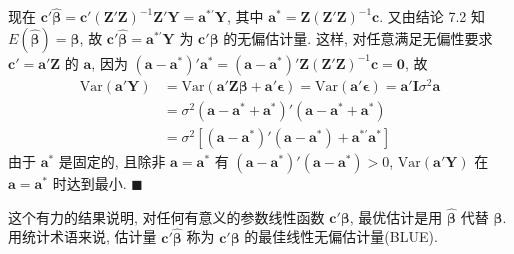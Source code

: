 现在 $\mathbf{c}'\hat{\boldsymbol{\beta}}=\mathbf{c}'(\mathbf{Z}'\mathbf{Z})^{-1}\mathbf{Z}'\mathbf{Y}=\mathbf{a}^{*'}\mathbf{Y}$, 其中 $\mathbf{a}^*=\mathbf{Z}(\mathbf{Z}'\mathbf{Z})^{-1}\mathbf{c}$. 又由结论 7.2 知 $E(\hat{\boldsymbol{\beta}})=\boldsymbol{\beta}$, 故 $\mathbf{c}'\hat{\boldsymbol{\beta}}=\mathbf{a}^{*'}\mathbf{Y}$ 为 $\mathbf{c}'\boldsymbol{\beta}$ 的无偏估计量. 这样, 对任意满足无偏性要求 $\mathbf{c}'=\mathbf{a}'\mathbf{Z}$ 的 $\mathbf{a}$, 因为 $(\mathbf{a}-\mathbf{a}^*)'\mathbf{a}^*=(\mathbf{a}-\mathbf{a}^*)'\mathbf{Z}(\mathbf{Z}'\mathbf{Z})^{-1}\mathbf{c}=\mathbf{0}$, 故
\[
\begin{aligned}
\text{Var}(\mathbf{a}'\mathbf{Y})&=\text{Var}(\mathbf{a}'\mathbf{Z}\boldsymbol{\beta}+\mathbf{a}'\boldsymbol{\epsilon})=\text{Var}(\mathbf{a}'\boldsymbol{\epsilon})=\mathbf{a}'\mathbf{I}\sigma^2\mathbf{a}\\
&=\sigma^2(\mathbf{a}-\mathbf{a}^*+\mathbf{a}^*)'(\mathbf{a}-\mathbf{a}^*+\mathbf{a}^*)\\
&=\sigma^2[(\mathbf{a}-\mathbf{a}^*)'(\mathbf{a}-\mathbf{a}^*)+\mathbf{a}^{*'}\mathbf{a}^*]
\end{aligned}
\]
由于 $\mathbf{a}^*$ 是固定的, 且除非 $\mathbf{a}=\mathbf{a}^*$ 有 $(\mathbf{a}-\mathbf{a}^*)'(\mathbf{a}-\mathbf{a}^*)>0$, $\text{Var}(\mathbf{a}'\mathbf{Y})$ 在 $\mathbf{a}=\mathbf{a}^*$ 时达到最小. \hfill$\blacksquare$

这个有力的结果说明, 对任何有意义的参数线性函数 $\mathbf{c}'\boldsymbol{\beta}$, 最优估计是用 $\hat{\boldsymbol{\beta}}$ 代替 $\boldsymbol{\beta}$. 用统计术语来说, 估计量 $\mathbf{c}'\hat{\boldsymbol{\beta}}$ 称为 $\mathbf{c}'\boldsymbol{\beta}$ 的最佳线性无偏估计量(BLUE).
